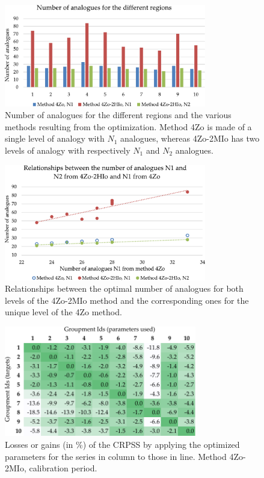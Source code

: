 \documentclass[review]{elsarticle}
\begin{document}
\begin{figure}[htb]
	\centerline{\includegraphics[width=8.8cm]{figures/fig11.pdf}}
	\caption{Number of analogues for the different regions and the various methods resulting from the optimization. Method 4Zo is made of a single level of analogy with $N_{1}$ analogues, whereas 4Zo-2MIo has two levels of analogy with respectively $N_{1}$ and $N_{2}$ analogues.}
	\label{fig:figure_nb_analogues}
\end{figure}

\begin{figure}[htb]
	\centerline{\includegraphics[width=8.8cm]{figures/fig12.pdf}}
	\caption{Relationships between the optimal number of analogues for both levels of the 4Zo-2MIo method and the corresponding ones for the unique level of the 4Zo method.}
	\label{fig:figure_nb_analogues_relationships}
\end{figure}

\begin{figure}[htb]
	\centerline{\includegraphics[width=8.4cm]{figures/fig13.pdf}}
	\caption{Losses or gains (in \%) of the CRPSS by applying the optimized parameters for the series in column to those in line. Method 4Zo-2MIo, calibration period.}
	\label{fig:crossing_4Zo-2MIo_calib}
\end{figure}
\end{document}
